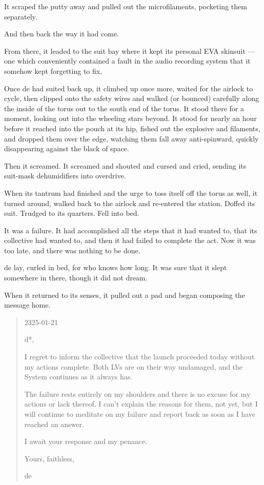 It scraped the putty away and pulled out the microfilaments, pocketing them separately.

And then back the way it had come.

From there, it leaded to the suit bay where it kept its personal EVA skinsuit — one which conveniently contained a fault in the audio recording system that it somehow kept forgetting to fix.

Once de had suited back up, it climbed up once more, waited for the airlock to cycle, then clipped onto the safety wires and walked (or bounced) carefully along the inside of the torus out to the south end of the torus. It stood there for a moment, looking out into the wheeling stars beyond. It stood for nearly an hour before it reached into the pouch at its hip, fished out the explosive and filaments, and dropped them over the edge, watching them fall away anti-spinward, quickly disappearing against the black of space.

Then it screamed. It screamed and shouted and cursed and cried, sending its suit-mask dehumidifiers into overdrive.

When its tantrum had finished and the urge to toss itself off the torus as well, it turned around, walked back to the airlock and re-entered the station. Doffed its suit. Trudged to its quarters. Fell into bed.

It was a failure. It had accomplished all the steps that it had wanted to, that its collective had wanted to, and then it had failed to complete the act. Now it was too late, and there was nothing to be done.

de lay, curled in bed, for who knows how long. It was sure that it slept somewhere in there, though it did not dream.

When it returned to its senses, it pulled out a pad and began composing the message home.

\begin{quote}
2325-01-21

d*,

I regret to inform the collective that the launch proceeded today without my actions complete. Both LVs are on their way undamaged, and the System continues as it always has.

The failure rests entirely on my shoulders and there is no excuse for my actions or lack thereof. I can't explain the reasons for them, not yet, but I will continue to meditate on my failure and report back as soon as I have reached an answer.

I await your response and my penance.

Yours, faithless,

de
\end{quote}

